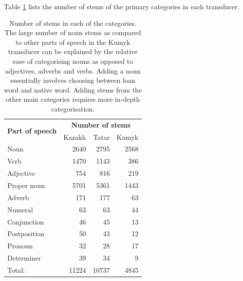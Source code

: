 \documentclass[a4paper,11pt,twocolumn]{article}
\begin{document}

Table \ref{table:stems} lists the number of stems of the primary categories in each transducer.

\begin{table}
\begin{center}
\begin{tabular}{lrrr}
		\toprule
\multirow{2}{*}{\textbf{Part of speech}} & \multicolumn{3}{c}{\textbf{Number of stems}} \\ \cline{2-4}
                        & Kazakh & Tatar & Kumyk \\
		\midrule
		Noun & 2640 & 2795 & 2568 \\
		Verb & 1470 & 1143 & 386 \\
		Adjective & 754 & 816 & 219 \\
		Proper noun & 5701 & 5361 & 1443 \\
		Adverb & 171 & 177 & 63 \\
		Numeral & 63 & 63 & 44 \\
		Conjunction & 46 & 45 & 13 \\
		Postposition & 50 & 43 & 12 \\
		Pronoun & 32 & 28 & 17 \\
		Determiner & 39 & 34 & 9 \\
		\midrule
		Total: & 11224 & 10737 & 4845 \\
		\bottomrule
\end{tabular}
 \caption{Number of stems in each of the categories. The large number of noun stems as compared
    to other parts of speech in the Kumyk transducer can be explained by the relative ease of 
    categorising nouns as opposed to adjectives, adverbs and verbs. Adding a noun essentially involves
    choosing between loan word and native word. Adding stems from the other main categories 
    requires more in-depth categorisation.}
 \label{table:stems}
\end{center}
\vspace{-2em}
\end{table}

\end{document}
